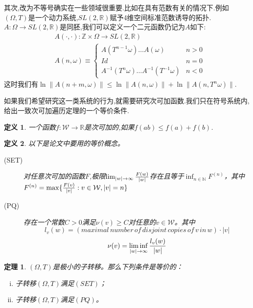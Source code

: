 \documentclass[a4paper,11pt,oneside]{book}
\newtheorem{theorem}{\textbf{\hspace{0.7cm}定理}}[section]
\newtheorem{definition}{\textbf{\hspace{0.7cm}定义}}[section]
\begin{document}
其次,改为不等号确实在一些领域很重要.比如在具有范数有关的情况下.例如$(\Omega,T)$是一个动力系统,$SL(2,\mathbb{R})$赋予4维空间标准范数诱导的拓扑.$A:\Omega\rightarrow SL(2,\mathbb{R})$是同胚,我们可以定义一个二元函数仍记为$A$如下:
\begin{align*}
&A(\cdot,\cdot):\mathbb{Z}\times\Omega\rightarrow SL(2,\mathbb{R})\\
&A(n,\omega)\equiv
\begin{cases}
A(T^{n-1}\omega)\ldots A(\omega)&n>0\\
Id &n=0\\
A^{-1}(T^n\omega)\ldots A^{-1}(T^{-1}\omega) &n<0
\end{cases}
\end{align*}
这时我们有$\ln\|A(n+m,\omega)\|\leq \ln\|A(n,\omega)\|+\ln\|A(n,T^n\omega)\|$.

如果我们希望研究这一类系统的行为,就需要研究次可加函数.我们只在符号系统内,给出一致次可加遍历定理的一个等价条件.
\begin{definition}
一个函数$f:\mathcal{W}\rightarrow \mathbb{R}$是次可加的,如果$f(ab)\leq f(a)+f(b)$.
\end{definition}

\begin{definition}
以下是论文中要用的等价概念。
\begin{description}
\item[(SET)] 对任意次可加的函数$F$,极限$\lim_{|w|\to \infty}{F(w)\over |w|}$存在且等于$\inf_{n\in \mathbb{N}}F^{(n)}$，其中$F^{(n)}=\max\{{F(v)\over |v|}:v\in\mathcal{W},|v|=n\}$
\item[(PQ)] 存在一个常数$C>0$满足$\nu(v)\geq C$对任意的$v\in \mathcal{W}$。其中
$$l_v(w)=(maximal\, number\, o\!f\, disj\!oint\, copie\!s\, o\!f\, v\, in\, w)\cdot |v|$$
$$\nu(v)=\liminf_{|w|\to \infty}{l_v(w)\over |w|}$$
\end{description}
\end{definition}
\begin{theorem}
$(\Omega,T)$是极小的子转移。那么下列条件是等价的：
\begin{enumerate}[(i)]
\item 子转移$(\Omega,T)$满足$(SET)$；
\item 子转移$(\Omega,T)$满足$(PQ)$。
\end{enumerate}
\end{theorem}
\end{document}
